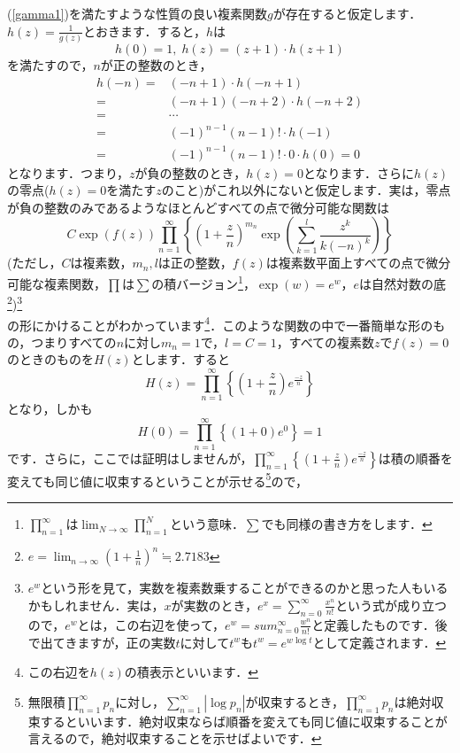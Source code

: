 \documentclass[./main]{subfile}
\begin{document}
(\ref{gamma1})を満たすような性質の良い複素関数$g$が存在すると仮定します．$h(z)=\frac{1}{g(z)}$とおきます．すると，$h$は
\begin{equation}\label{invg}
h(0)=1,\;h(z)=(z+1)\cdot h(z+1)
\end{equation}
を満たすので，$n$が正の整数のとき，
\begin{align*}
h(-n)=&(-n+1)\cdot h(-n+1)\\
=&(-n+1)(-n+2)\cdot h(-n+2)\\
=&\cdots\\
=&(-1)^{n-1}(n-1)!\cdot h(-1)\\
=&(-1)^{n-1}(n-1)!\cdot0\cdot h(0)=0
\end{align*}
となります．つまり，$z$が負の整数のとき，$h(z)=0$となります．さらに$h(z)$の零点($h(z)=0$を満たす$z$のこと)がこれ以外にないと仮定します．実は，零点が負の整数のみであるようなほとんどすべての点で微分可能な関数は
\[
C\exp(f(z))\prod_{n=1}^{\infty}\left\{\left(1+\frac{z}{n}\right)^{m_n}\exp\left(\sum_{k=1}^l\frac{z^k}{k(-n)^k}\right)\right\}
\]
(ただし，$C$は複素数，$m_n,l$は正の整数，$f(z)$は複素数平面上すべての点で微分可能な複素関数，$\prod$は$\sum$の積バージョン\footnote{$\prod_{n=1}^{\infty}$は$\lim_{N\to\infty}\prod_{n=1}^N$という意味．$\sum$でも同様の書き方をします．}，$\exp(w)=e^w$，$e$は自然対数の底\footnote{$e=\lim_{n\to\infty}\left(1+\frac{1}{n}\right)^n\fallingdotseq 2.7183$})\footnote{$e^w$という形を見て，実数を複素数乗することができるのかと思った人もいるかもしれません．実は，$x$が実数のとき，$e^x=\sum_{n=0}^{\infty}\frac{x^n}{n!}$という式が成り立つので，$e^w$とは，この右辺を使って，$e^w=sum_{n=0}^{\infty}\frac{w^n}{n!}$と定義したものです．後で出てきますが，正の実数$t$に対して$t^w$も$t^w=e^{w\log t}$として定義されます．}\\
の形にかけることがわかっています\footnote{この右辺を$h(z)$の積表示といいます．}．このような関数の中で一番簡単な形のもの，つまりすべての$n$に対し$m_n=1$で，$l=C=1$，すべての複素数$z$で$f(z)=0$のときのものを$H(z)$とします．すると
\[
H(z)=\prod_{n=1}^{\infty}\left\{\left(1+\frac{z}{n}\right)e^{\frac{-z}{n}}\right\}
\]
となり，しかも
\[
H(0)=\prod_{n=1}^{\infty}\left\{(1+0)e^0\right\}=1
\]
です．さらに，ここでは証明はしませんが，$\prod_{n=1}^{\infty}\left\{\left(1+\frac{z}{n}\right)e^{\frac{-z}{n}}\right\}$は積の順番を変えても同じ値に収束するということが示せる\footnote{無限積$\prod_{n=1}^{\infty}p_n$に対し，$\sum_{n=1}^{\infty}|\log p_n|$が収束するとき，$\prod_{n=1}^{\infty}p_n$は絶対収束するといいます．絶対収束ならば順番を変えても同じ値に収束することが言えるので，絶対収束することを示せばよいです．}ので，
\end{document}
